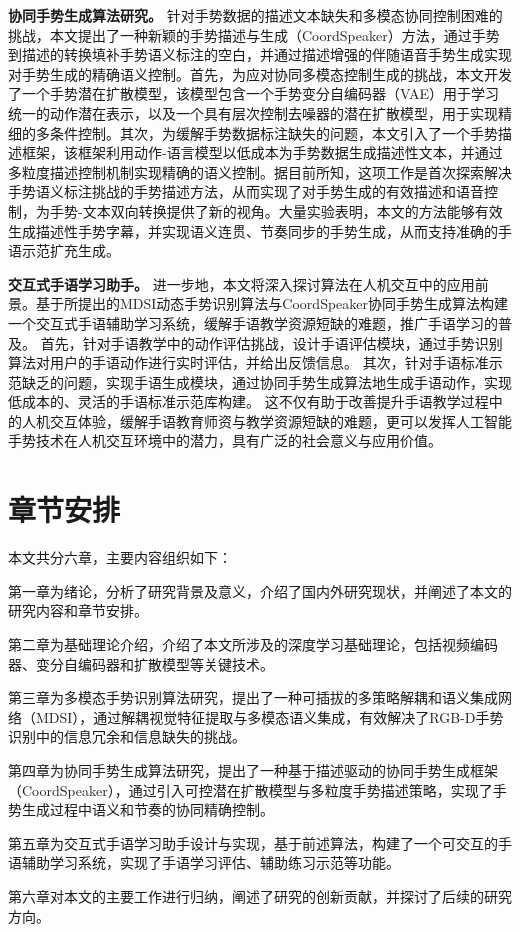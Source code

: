 \textbf{协同手势生成算法研究。} 
针对手势数据的描述文本缺失和多模态协同控制困难的挑战，本文提出了一种新颖的手势描述与生成（CoordSpeaker）方法，通过手势到描述的转换填补手势语义标注的空白，并通过描述增强的伴随语音手势生成实现对手势生成的精确语义控制。首先，为应对协同多模态控制生成的挑战，本文开发了一个手势潜在扩散模型，该模型包含一个手势变分自编码器（VAE）用于学习统一的动作潜在表示，以及一个具有层次控制去噪器的潜在扩散模型，用于实现精细的多条件控制。其次，为缓解手势数据标注缺失的问题，本文引入了一个手势描述框架，该框架利用动作-语言模型以低成本为手势数据生成描述性文本，并通过多粒度描述控制机制实现精确的语义控制。据目前所知，这项工作是首次探索解决手势语义标注挑战的手势描述方法，从而实现了对手势生成的有效描述和语音控制，为手势-文本双向转换提供了新的视角。大量实验表明，本文的方法能够有效生成描述性手势字幕，并实现语义连贯、节奏同步的手势生成，从而支持准确的手语示范扩充生成。

\textbf{交互式手语学习助手。}
进一步地，本文将深入探讨算法在人机交互中的应用前景。基于所提出的MDSI动态手势识别算法与CoordSpeaker协同手势生成算法构建一个交互式手语辅助学习系统，缓解手语教学资源短缺的难题，推广手语学习的普及。
首先，针对手语教学中的动作评估挑战，设计手语评估模块，通过手势识别算法对用户的手语动作进行实时评估，并给出反馈信息。
其次，针对手语标准示范缺乏的问题，实现手语生成模块，通过协同手势生成算法地生成手语动作，实现低成本的、灵活的手语标准示范库构建。
这不仅有助于改善提升手语教学过程中的人机交互体验，缓解手语教育师资与教学资源短缺的难题\cite{2022signlearning}，更可以发挥人工智能手势技术在人机交互环境中的潜力，具有广泛的社会意义与应用价值。



\section{章节安排}

本文共分六章，主要内容组织如下：

第一章为绪论，分析了研究背景及意义，介绍了国内外研究现状，并阐述了本文的研究内容和章节安排。

第二章为基础理论介绍，介绍了本文所涉及的深度学习基础理论，包括视频编码器、变分自编码器和扩散模型等关键技术。

第三章为多模态手势识别算法研究，提出了一种可插拔的多策略解耦和语义集成网络（MDSI），通过解耦视觉特征提取与多模态语义集成，有效解决了RGB-D手势识别中的信息冗余和信息缺失的挑战。

第四章为协同手势生成算法研究，提出了一种基于描述驱动的协同手势生成框架（CoordSpeaker），通过引入可控潜在扩散模型与多粒度手势描述策略，实现了手势生成过程中语义和节奏的协同精确控制。

第五章为交互式手语学习助手设计与实现，基于前述算法，构建了一个可交互的手语辅助学习系统，实现了手语学习评估、辅助练习示范等功能。

第六章对本文的主要工作进行归纳，阐述了研究的创新贡献，并探讨了后续的研究方向。
